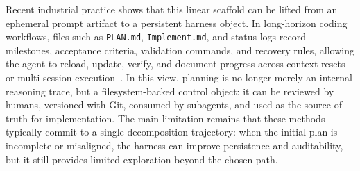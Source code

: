 \documentclass{llmxive}
\begin{document}
Recent industrial practice shows that this linear scaffold can be lifted from an ephemeral prompt artifact to a persistent harness object. In long-horizon coding workflows, files such as \texttt{PLAN.md}, \texttt{Implement.md}, and status logs record milestones, acceptance criteria, validation commands, and recovery rules, allowing the agent to reload, update, verify, and document progress across context resets or multi-session execution~\cite{openai2025execplans,openai2026codexlonghorizon}. In this view, planning is no longer merely an internal reasoning trace, but a filesystem-backed control object: it can be reviewed by humans, versioned with Git, consumed by subagents, and used as the source of truth for implementation. The main limitation remains that these methods typically commit to a single decomposition trajectory: when the initial plan is incomplete or misaligned, the harness can improve persistence and auditability, but it still provides limited exploration beyond the chosen path.
\end{document}
